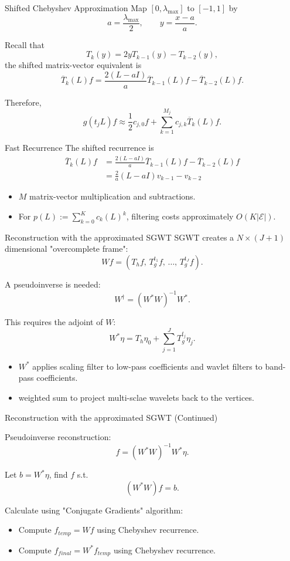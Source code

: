 \documentclass[aspectratio=1610,xcolor=dvipsnames,t]{beamer}
\newcommand{\E}{\mathcal{E}}
\begin{document}
\begin{frame}{Shifted Chebyshev Approximation}
Map $[0,\lambda_{\max}]$ to $[-1,1]$ by
\[
a=\frac{\lambda_{\max}}{2},
\qquad
y=\frac{x-a}{a}.
\]

Recall that
$$T_k(y)=2yT_{k-1}(y)-T_{k-2}(y),$$
the shifted matrix-vector equivalent is
$$\overline{T}_k(L)f=\frac{2(L-aI)}{a}\overline{T}_{k-1}(L)f-\overline{T}_{k-2}(L)f.$$

Therefore,
\[
g(t_jL)f
\approx
\frac{1}{2}c_{j,0}f+
\sum_{k=1}^{M_j}c_{j,k}\overline T_k(L)f.
\]
\end{frame}

\begin{frame}{Fast Recurrence}
The shifted recurrence is
\begin{align*}
    \overline T_k(L)f&=\frac{2(L-aI)}{a}\overline T_{k-1}(L)f-\overline T_{k-2}(L)f\\
    &=\frac{2}{a}(L-aI)v_{k-1}-v_{k-2}
\end{align*}

\begin{itemize}
  \item $M$ matrix-vector multiplication and subtractions.
  \item For $p(L):=\sum_{k=0}^Kc_k(L)^k$, filtering costs approximately $O(K|\E|)$.
\end{itemize}
\end{frame}

\begin{frame}{Reconstruction with the approximated SGWT}
SGWT creates a $N\times(J+1)$ dimensional "overcomplete frame":
\[
Wf=
\left(
T_hf,\,
T_g^{t_1}f,\,
\ldots,\,
T_g^{t_J}f
\right).
\]

A pseudoinverse is needed:
\[
W^\dagger=(W^*W)^{-1}W^*.
\]

This requires the adjoint of $W$:
\[
W^*\eta
=
T_h\eta_0+\sum_{j=1}^{J}T_g^{t_j}\eta_j.
\]

\begin{itemize}
    \item $W^*$ applies scaling filter to low-pass coefficients and wavlet filters to band-pass coefficients.
    \item weighted sum to project multi-sclae wavelets back to the vertices.
\end{itemize}
\end{frame}

\begin{frame}{Reconstruction with the approximated SGWT (Continued)}

Pseudoinverse reconstruction:
$$f=(W^*W)^{-1}W^*\eta.$$

Let $b=W^*\eta$,
find $f$ s.t.
$$(W^*W)f=b.$$

\medskip

Calculate using "Conjugate Gradients" algorithm:

\begin{itemize}
    \item Compute $f_{temp}=Wf$ using Chebyshev recurrence.
    \item Compute $f_{final}=W^*f_{temp}$ using Chebyshev recurrence.
\end{itemize}
\end{frame}
\end{document}
